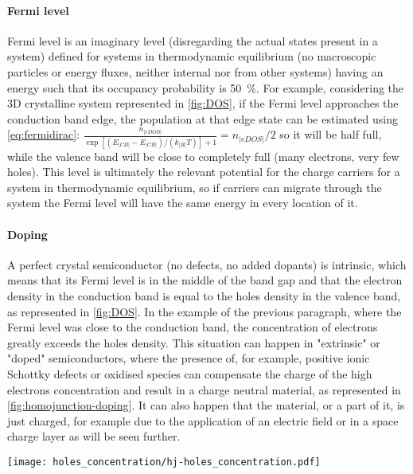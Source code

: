 		\paragraph{Fermi level}
		Fermi level is an imaginary level (disregarding the actual states present in a system) defined for systems in thermodynamic equilibrium (no macroscopic particles or energy fluxes, neither internal nor from other systems) having an energy such that its occupancy probability is \SI{50}{\%}.
		For example, considering the 3D crystalline system represented in \cref{fig:DOS}, if the Fermi level approaches the conduction band edge, the population at that edge state can be estimated using \cref{eq:fermidirac}: $\frac{n_|eDOS|}{\exp[(E_|CB|-E_|CB|)/(k_|B|T)]+1} = n_|eDOS|/2$ so it will be half full, while the valence band will be close to completely full (many electrons, very few holes).
		This level is ultimately the relevant potential for the charge carriers for a system in thermodynamic equilibrium, so if carriers can migrate through the system the Fermi level will have the same energy in every location of it.

		\paragraph{Doping}
		A perfect crystal semiconductor (no defects, no added dopants) is intrinsic, which means that its Fermi level is in the middle of the band gap and that the electron density in the conduction band is equal to the holes density in the valence band, as represented in \cref{fig:DOS}.
		In the example of the previous paragraph, where the Fermi level was close to the conduction band, the concentration of electrons greatly exceeds the holes density.
		This situation can happen in "extrinsic" or "doped" semiconductors, where the presence of, for example, positive ionic Schottky defects or oxidised species can compensate the charge of the high electrons concentration and result in a charge neutral material, as represented in \cref{fig:homojunction-doping}.
		It can also happen that the material, or a part of it, is just charged, for example due to the application of an electric field or in a space charge layer as will be seen further.

		\begin{SCfigure}
			\centering
			\texttt{[image: holes\_concentration/hj-holes\_concentration.pdf]}
			\label{fig:holes_concentration}
		\end{SCfigure}

